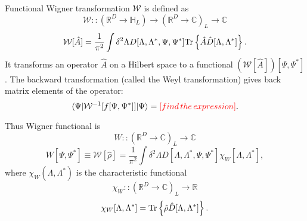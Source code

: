 Functional Wigner transformation $\mathcal{W}$ is defined as
\[
	\mathcal{W} ::
	(\mathbb{R}^D \rightarrow \mathbb{H}_L)
	\rightarrow
	(\mathbb{R}^D \rightarrow \mathbb{C})_L
	\rightarrow
	\mathbb{C}
\]
\begin{equation}
\label{eqn:formalism:func-wigner:w-transformation}
	\mathcal{W}[\hat{A}]
	= \frac{1}{\pi^2} \int \delta^2 \Lambda
		D[\Lambda, \Lambda^*, \Psi, \Psi^*]
		\mathrm{Tr} \left\{  \hat{A} \hat{D}[\Lambda, \Lambda^*]  \right\}.
\end{equation}
It transforms an operator $\hat{A}$ on a Hilbert space to a functional $(\mathcal{W}[\hat{A}])[\Psi, \Psi^*]$.
The backward transformation (called the Weyl transformation) gives back matrix elements of the operator:
\[
	\langle \Psi \lvert \mathcal{W}^{-1}[f[\Psi, \Psi^*]] \rvert \Psi \rangle
	= \textcolor{red}{[find\,the\,expression]}.
\]

Thus Wigner functional is
\[
	W :: (\mathbb{R}^D \rightarrow \mathbb{C})_L \rightarrow \mathbb{C}
\]
\begin{equation}
\label{eqn:formalism:func-wigner:w-functional}
	W [\Psi, \Psi^*]
	\equiv \mathcal{W}[\hat{\rho}]
	= \frac{1}{\pi^2} \int \delta^2 \Lambda
		D[\Lambda, \Lambda^*, \Psi, \Psi^*]
		\chi_W [\Lambda, \Lambda^*],
\end{equation}
where $\chi_W (\Lambda, \Lambda^*)$ is the characteristic functional
\[
	\chi_W :: (\mathbb{R}^D \rightarrow \mathbb{C})_L \rightarrow \mathbb{R}
\]
\[
	\chi_W [\Lambda, \Lambda^*]
	= \mathrm{Tr} \left\{  \hat{\rho} \hat{D}[\Lambda, \Lambda^*]  \right\}.
\]

